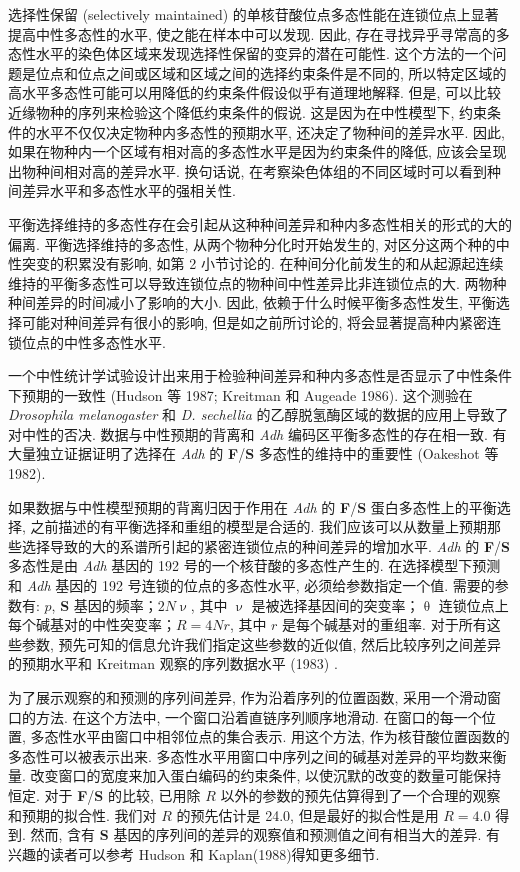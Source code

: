 \documentclass[
    12pt,%
    ]{article}
\begin{document}
选择性保留 (selectively maintained) 的单核苷酸位点多态性能在连锁位点上显著提高中性多态性的水平,
使之能在样本中可以发现. 因此, 存在寻找异乎寻常高的多态性水平的染色体区域来发现选择性保留的变异的潜在可能性.
这个方法的一个问题是位点和位点之间或区域和区域之间的选择约束条件是不同的,
所以特定区域的高水平多态性可能可以用降低的约束条件假设似乎有道理地解释. 但是,
可以比较近缘物种的序列来检验这个降低约束条件的假说. 这是因为在中性模型下, 约束条件的水平不仅仅决定物种内多态性的预期水平,
还决定了物种间的差异水平. 因此, 如果在物种内一个区域有相对高的多态性水平是因为约束条件的降低,
应该会呈现出物种间相对高的差异水平. 换句话说, 在考察染色体组的不同区域时可以看到种间差异水平和多态性水平的强相关性.

平衡选择维持的多态性存在会引起从这种种间差异和种内多态性相关的形式的大的偏离. 平衡选择维持的多态性,
从两个物种分化时开始发生的, 对区分这两个种的中性突变的积累没有影响, 如第 2 小节讨论的.
在种间分化前发生的和从起源起连续维持的平衡多态性可以导致连锁位点的物种间中性差异比非连锁位点的大.
两物种种间差异的时间减小了影响的大小. 因此, 依赖于什么时候平衡多态性发生, 平衡选择可能对种间差异有很小的影响,
但是如之前所讨论的, 将会显著提高种内紧密连锁位点的中性多态性水平.

一个中性统计学试验设计出来用于检验种间差异和种内多态性是否显示了中性条件下预期的一致性 (Hudson 等 1987; Kreitman 和
Augeade 1986). 这个测验在 \textit{Drosophila melanogaster} 和 \textit{D.
sechellia} 的乙醇脱氢酶区域的数据的应用上导致了对中性的否决.
数据与中性预期的背离和 \textit{Adh} 编码区平衡多态性的存在相一致.
有大量独立证据证明了选择在 \textit{Adh} 的 \textbf{F}/\textbf{S} 多态性的维持中的重要性 (Oakeshot 等 1982).

如果数据与中性模型预期的背离归因于作用在 \textit{Adh} 的 \textbf{F}/\textbf{S} 蛋白多态性上的平衡选择,
之前描述的有平衡选择和重组的模型是合适的.
我们应该可以从数量上预期那些选择导致的大的系谱所引起的紧密连锁位点的种间差异的增加水平.
\textit{Adh} 的 \textbf{F}/\textbf{S} 多态性是由 \textit{Adh} 基因的 192 号的一个核苷酸的多态性产生的.
在选择模型下预测和 \textit{Adh} 基因的 192 号连锁的位点的多态性水平, 必须给参数指定一个值. 需要的参数有: $p$,
\textbf{S} 基因的频率；$2N\upnu$, 其中 $\upnu$ 是被选择基因间的突变率；$\uptheta$
连锁位点上每个碱基对的中性突变率；$R=4Nr$, 其中 $r$ 是每个碱基对的重组率. 对于所有这些参数,
预先可知的信息允许我们指定这些参数的近似值, 然后比较序列之间差异的预期水平和 Kreitman 观察的序列数据水平 (1983) .

为了展示观察的和预测的序列间差异, 作为沿着序列的位置函数, 采用一个滑动窗口的方法. 在这个方法中,
一个窗口沿着直链序列顺序地滑动. 在窗口的每一个位置, 多态性水平由窗口中相邻位点的集合表示. 用这个方法,
作为核苷酸位置函数的多态性可以被表示出来. 多态性水平用窗口中序列之间的碱基对差异的平均数来衡量.
改变窗口的宽度来加入蛋白编码的约束条件, 以使沉默的改变的数量可能保持恒定. 对于 \textbf{F}/\textbf{S} 的比较, 已用除 $R$
以外的参数的预先估算得到了一个合理的观察和预期的拟合性. 我们对 $R$ 的预先估计是 24.0, 但是最好的拟合性是用 $R=4.0$
得到. 然而, 含有 \textbf{S} 基因的序列间的差异的观察值和预测值之间有相当大的差异. 有兴趣的读者可以参考 Hudson 和
Kaplan(1988)得知更多细节.
\end{document}
